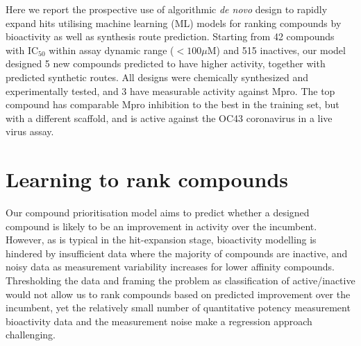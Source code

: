 Here we report the prospective use of algorithmic \emph{de novo} design to rapidly expand hits utilising machine learning (ML) models for ranking compounds by bioactivity as well as synthesis route prediction. Starting from 42 compounds with $\mathrm{IC}_{50}$ within assay dynamic range ($<100 \mu$M) and 515 inactives, our model designed 5 new compounds predicted to have higher activity, together with predicted synthetic routes. All designs were chemically synthesized and experimentally tested, and 3 have measurable activity against Mpro. The top compound has comparable Mpro inhibition to the best in the training set, but with a different scaffold, and is active against the OC43 coronavirus in a live virus assay.


\section{Learning to rank compounds}
Our compound prioritisation model aims to predict whether a designed compound is likely to be an improvement in activity over the incumbent. However, as is typical in the hit-expansion stage, bioactivity modelling is hindered by insufficient data where the majority of compounds are inactive, and noisy data as measurement variability increases for lower affinity compounds. Thresholding the data and framing the problem as classification of active/inactive would not allow us to rank compounds based on predicted improvement over the incumbent, yet the relatively small number of quantitative potency measurement bioactivity data and the measurement noise make a regression approach challenging.

